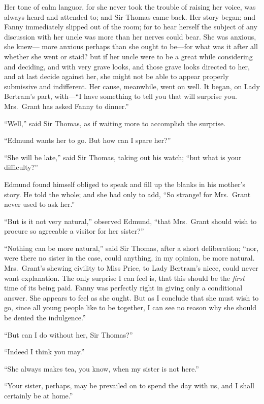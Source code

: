Her tone of calm languor, for she never took the trouble
of raising her voice, was always heard and attended to;
and Sir Thomas came back.  Her story began; and Fanny
immediately slipped out of the room; for to hear herself
the subject of any discussion with her uncle was more
than her nerves could bear.  She was anxious, she knew---%
more anxious perhaps than she ought to be---for what was
it after all whether she went or staid? but if her uncle
were to be a great while considering and deciding,
and with very grave looks, and those grave looks directed
to her, and at last decide against her, she might not
be able to appear properly submissive and indifferent.
Her cause, meanwhile, went on well.  It began, on Lady
Bertram's part, with---``I have something to tell you
that will surprise you.  Mrs.\ Grant has asked Fanny
to dinner.''

``Well,'' said Sir Thomas, as if waiting more to accomplish
the surprise.

``Edmund wants her to go.  But how can I spare her?''

``She will be late,'' said Sir Thomas, taking out his watch;
``but what is your difficulty?''

Edmund found himself obliged to speak and fill up
the blanks in his mother's story.  He told the whole;
and she had only to add, ``So strange! for Mrs.\ Grant
never used to ask her.''

``But is it not very natural,'' observed Edmund,
``that Mrs.\ Grant should wish to procure so agreeable
a visitor for her sister?''

``Nothing can be more natural,'' said Sir Thomas, after a
short deliberation; ``nor, were there no sister in the case,
could anything, in my opinion, be more natural.
Mrs.\ Grant's shewing civility to Miss Price, to Lady
Bertram's niece, could never want explanation.  The only
surprise I can feel is, that this should be the \emph{first}
time of its being paid.  Fanny was perfectly right in
giving only a conditional answer.  She appears to feel
as she ought.  But as I conclude that she must wish to go,
since all young people like to be together, I can see
no reason why she should be denied the indulgence.''

``But can I do without her, Sir Thomas?''

``Indeed I think you may.''

``She always makes tea, you know, when my sister is not here.''

``Your sister, perhaps, may be prevailed on to spend
the day with us, and I shall certainly be at home.''

